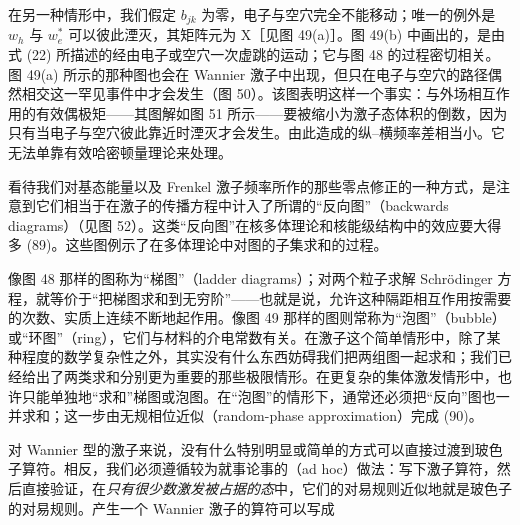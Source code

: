 在另一种情形中，我们假定 $b_{jk}$ 为零，电子与空穴完全不能移动；唯一的例外是 $w_h$ 与 $w_e^{*}$ 可以彼此湮灭，其矩阵元为 X［见图 49(a)］。图 49(b) 中画出的，是由式 (22) 所描述的经由电子或空穴一次虚跳的运动；它与图 48 的过程密切相关。图 49(a) 所示的那种图也会在 Wannier 激子中出现，但只在电子与空穴的路径偶然相交这一罕见事件中才会发生（图 50）。该图表明这样一个事实：与外场相互作用的有效偶极矩——其图解如图 51 所示——要被缩小为激子态体积的倒数，因为只有当电子与空穴彼此靠近时湮灭才会发生。由此造成的纵–横频率差相当小。它无法单靠有效哈密顿量理论来处理。




看待我们对基态能量以及 Frenkel 激子频率所作的那些零点修正的一种方式，是注意到它们相当于在激子的传播方程中计入了所谓的“反向图”（backwards diagrams）（见图 52）。这类“反向图”在核多体理论和核能级结构中的效应要大得多 (89)。这些图例示了在多体理论中对图的子集求和的过程。


像图 48 那样的图称为“梯图”（ladder diagrams）；对两个粒子求解 Schrödinger 方程，就等价于“把梯图求和到无穷阶”——也就是说，允许这种隔距相互作用按需要的次数、实质上连续不断地起作用。像图 49 那样的图则常称为“泡图”（bubble）或“环图”（ring），它们与材料的介电常数有关。在激子这个简单情形中，除了某种程度的数学复杂性之外，其实没有什么东西妨碍我们把两组图一起求和；我们已经给出了两类求和分别更为重要的那些极限情形。在更复杂的集体激发情形中，也许只能单独地“求和”梯图或泡图。在“泡图”的情形下，通常还必须把“反向”图也一并求和；这一步由无规相位近似（random-phase approximation）完成 (90)。

对 Wannier 型的激子来说，没有什么特别明显或简单的方式可以直接过渡到玻色子算符。相反，我们必须遵循较为就事论事的（ad hoc）做法：写下激子算符，然后直接验证，在\emph{只有很少数激发被占据的态}中，它们的对易规则近似地就是玻色子的对易规则。产生一个 Wannier 激子的算符可以写成

